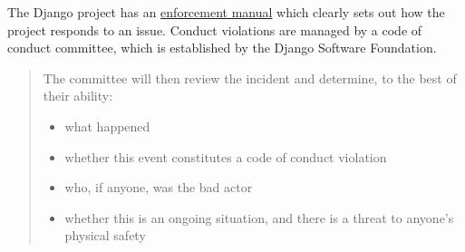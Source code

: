 \begin{kaobox}[frametitle=Django: enforcement of code of conduct]

The Django project has an \href{https://www.djangoproject.com/conduct/enforcement-manual/}{enforcement manual} which clearly sets out how the project responds to an issue.  Conduct violations are managed by a code of conduct committee, which is established by the Django Software Foundation.

\begin{quote}

The committee will then review the incident and determine, to the best of their ability:

\begin{itemize}

\item what happened
\item whether this event constitutes a code of conduct violation
\item who, if anyone, was the bad actor
\item whether this is an ongoing situation, and there is a threat to anyone's physical safety

\end{itemize}

\end{quote}

\end{kaobox}

